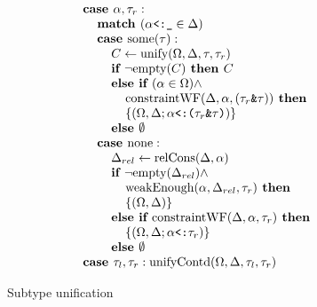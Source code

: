 \documentclass[acmsmall]{acmart}
\begin{document}
\begin{figure*}[h]
\[\begin{array}[t]{@{} l}
    \I \B{case } \alpha, \tau_r : 
    \\
    \I\I \B{match } (\code{$\alpha$<:\_} \in \Delta)
    \\
    \I\I \B{case } \F{some}(\tau) :
    \\
    \I\I\I C \leftarrow \F{unify}(\Omega, \Delta, \tau, \tau_r)
    \\
    \I\I\I \B{if } \neg \F{empty}(C) \B{ then } C
    \\
    \I\I\I \B{else if } (\alpha \in \Omega) \wedge 
    \\
    \I\I\I\I \F{constraintWF}(\Delta, \alpha, (\code{$\tau_r$\&$\tau$})) \B{ then }
    \\
    \I\I\I\I \{(\Omega, \Delta;\code{$\alpha$<:($\tau_r$\&$\tau$)})\}
    \\
    \I\I\I \B{else } \emptyset 
    \\
    \I\I \B{case } \F{none} :
    \\
    \I\I\I \Delta_{rel} \leftarrow \F{relCons}(\Delta, \alpha)  
    \\
    \I\I\I \B{if } \neg \F{empty}(\Delta_{rel}) \wedge 
    \\
    \I\I\I\I \F{weakEnough}(\alpha, \Delta_{rel}, \tau_r) \B{ then }
    \\
    \I\I\I\I \{(\Omega, \Delta)\}
    \\
    \I\I\I \B{else if } \F{constraintWF}(\Delta, \alpha, \tau_r) \B{ then }
    \\
    \I\I\I\I \{(\Omega, \Delta;\code{$\alpha$<:$\tau_r$})\}
    \\
    \I\I\I \B{else } \emptyset 

    \\

    \I \B{case } \tau_l, \tau_r : \F{unifyContd}(\Omega, \Delta, \tau_l, \tau_r)


\end{array}
\]

\caption{Subtype unification}
\end{figure*}
\end{document}
